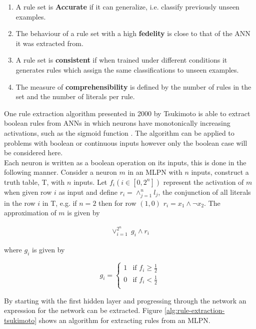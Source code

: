 \begin{enumerate}
\item A rule set is \textbf{Accurate} if it can generalize, i.e. classify previously unseen examples.
\item The behaviour of a rule set with a high \textbf{fedelity} is close to that of the ANN it was extracted from.
\item A rule set is \textbf{consistent} if when trained under different conditions it generates rules which assign the same classifications to unseen examples.
\item The measure of \textbf{comprehensibility} is defined by the number of rules in the set and the number of literals per rule.
\end{enumerate}

One rule extraction algorithm presented in 2000 by Tsukimoto is able to extract boolean rules from ANNs in which neurons have monotonically increasing activations, such as the sigmoid function \cite{tsukimoto2000extracting}. The algorithm can be applied to problems with boolean or continuous inputs however only the boolean case will be considered here.\\

Each neuron is written as a boolean operation on its inputs, this is done in the following manner. Consider a neuron $m$ in an MLPN with $n$ inputs, construct a truth table, T, with $n$ inputs. Let $f_i (i \in [0, 2^n])$ represent the activation of $m$ when given row $i$ as input and define $r_i = \land_{j=1}^{n} l_j$, the conjunction of all literals in the row $i$ in T, e.g. if $n=2$ then for row $(1,0)$ $r_i = x_1 \land \lnot x_2$. The approximation of $m$ is given by 

\begin{align}
	\lor_{i=1}^{2^n}\ g_i \land r_i
\end{align}

where $g_i$ is given by

\[
g_i =
\begin{cases}
1 & \text{if $f_i \geq \frac{1}{2}$} \\
0 & \text{if $f_i < \frac{1}{2}$} \\
\end{cases}
\]

By starting with the first hidden layer and progressing through the network an expression for the network can be extracted. Figure \ref{alg:rule-extraction-tsukimoto} shows an algorithm for extracting rules from an MLPN.

